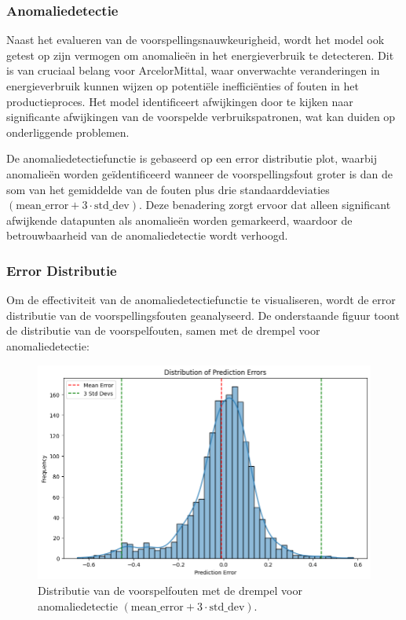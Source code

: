 \subsubsection{Anomaliedetectie}
Naast het evalueren van de voorspellingsnauwkeurigheid, wordt het model ook getest op zijn vermogen om anomalieën in het energieverbruik te detecteren. Dit is van cruciaal belang voor ArcelorMittal, waar onverwachte veranderingen in energieverbruik kunnen wijzen op potentiële inefficiënties of fouten in het productieproces. Het model identificeert afwijkingen door te kijken naar significante afwijkingen van de voorspelde verbruikspatronen, wat kan duiden op onderliggende problemen.

De anomaliedetectiefunctie is gebaseerd op een error distributie plot, waarbij anomalieën worden geïdentificeerd wanneer de voorspellingsfout groter is dan de som van het gemiddelde van de fouten plus drie standaarddeviaties \((\text{mean\_error} + 3 \cdot \text{std\_dev})\). Deze benadering zorgt ervoor dat alleen significant afwijkende datapunten als anomalieën worden gemarkeerd, waardoor de betrouwbaarheid van de anomaliedetectie wordt verhoogd.

\subsubsection{Error Distributie}
Om de effectiviteit van de anomaliedetectiefunctie te visualiseren, wordt de error distributie van de voorspellingsfouten geanalyseerd. De onderstaande figuur toont de distributie van de voorspelfouten, samen met de drempel voor anomaliedetectie:

\begin{figure}[ht]
    \centering
    \includegraphics[width=\textwidth]{graphics/ErrorDistribution.png}
    \caption{Distributie van de voorspelfouten met de drempel voor anomaliedetectie \((\text{mean\_error} + 3 \cdot \text{std\_dev})\).}
    \label{fig:ErrorDistribution}
\end{figure}

